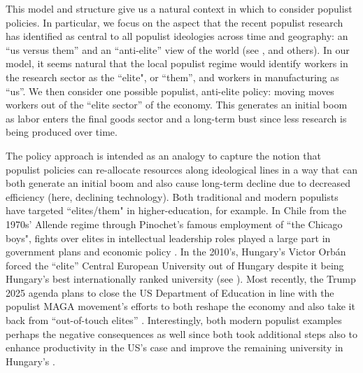 \documentclass{OUP-EJ}
\begin{document}
This model and structure give us a natural context in which to consider populist policies. In particular, we focus on the aspect that the recent populist research has identified as central to all populist ideologies across time and geography: an “us versus them” and an “anti-elite” view of the world (see \cite{KaltwasserTaggart2015}, \cite{WysockiFreytag2024} and others). In our model, it seems natural that the local populist regime would identify workers in the research sector as the ``elite", or ``them”, and workers in manufacturing as ``us”. We then consider one possible populist, anti-elite policy: moving moves workers out of the “elite sector” of the economy. This generates an initial boom as labor enters the final goods sector and a long-term bust since less research is being produced over time.

The policy approach is intended as an analogy to capture the notion that populist policies can re-allocate resources along ideological lines in a way that can both generate an initial boom and also cause long-term decline due to decreased efficiency (here, declining technology).  Both traditional and modern populists have targeted ``elites/them" in higher-education, for example.  In Chile from the 1970s' Allende regime through Pinochet's famous employment of “the Chicago boys", fights over elites in intellectual leadership roles played a large part in government plans and economic policy \cite{Edwards2023}.  In the 2010's, Hungary's Victor Orb\'an forced the “elite” Central European University out of Hungary despite it being Hungary's best internationally ranked university (see \cite{NYT2018}).  Most recently, the Trump 2025 agenda plans to close the US Department of Education in line with the populist MAGA movement's efforts to both reshape the economy and also take it back from “out-of-touch elites” \cite{TrumpGOP2024}.  Interestingly, both modern populist examples perhaps the negative consequences as well since both took additional steps also to enhance productivity in the US's case \cite{TrumpGOP2024} and improve the remaining university in Hungary's \cite{CNN2021}.
\end{document}

